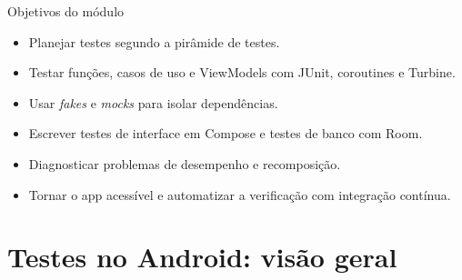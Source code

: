 \documentclass[aspectratio=169,10pt]{beamer}
\begin{document}
\capa

\begin{frame}{Objetivos do módulo}
  \begin{conceito}
    \begin{itemize}
      \item Planejar testes segundo a pirâmide de testes.
      \item Testar funções, casos de uso e ViewModels com JUnit, coroutines e Turbine.
      \item Usar \emph{fakes} e \emph{mocks} para isolar dependências.
      \item Escrever testes de interface em Compose e testes de banco com Room.
      \item Diagnosticar problemas de desempenho e recomposição.
      \item Tornar o app acessível e automatizar a verificação com integração contínua.
    \end{itemize}
  \end{conceito}
\end{frame}

\sumario



\section{Testes no Android: visão geral}
\end{document}
